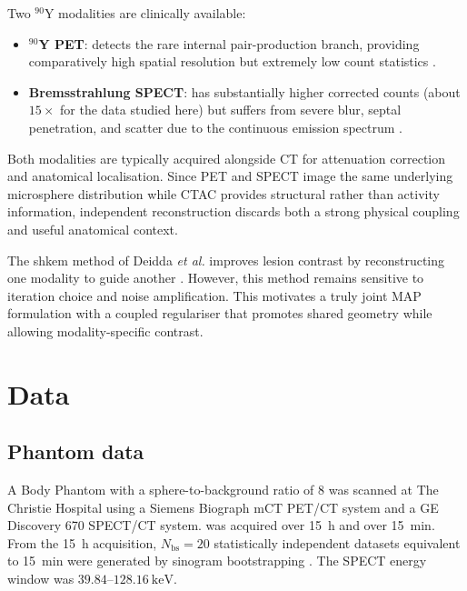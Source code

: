 Two $^{90}$Y modalities are clinically available:
\begin{itemize}
    \item \textbf{$^{90}$Y PET}: detects the rare internal pair-production branch, providing comparatively high spatial resolution but extremely low count statistics \cite{selwynNewInternalPair2007}.
    \item \textbf{Bremsstrahlung SPECT}: has substantially higher corrected counts (about $15\times$ for the data studied here) but suffers from severe blur, septal penetration, and scatter due to the continuous emission spectrum \cite{rongDevelopmentEvaluationImproved2012, minarikEvaluationQuantitative90Y2008}.
\end{itemize}
Both modalities are typically acquired alongside CT for attenuation correction and anatomical localisation. Since PET and SPECT image the same underlying microsphere distribution while CTAC provides structural rather than activity information, independent reconstruction discards both a strong physical coupling and useful anatomical context.

The \gls{shkem} method of Deidda \textit{et al.} improves lesion contrast by reconstructing one modality to guide another \cite{deiddaTripleModalityImage2023, deiddaHybridKernelisedExpectation2022}. However, this method remains sensitive to iteration choice and noise amplification. This motivates a truly joint MAP formulation with a coupled regulariser that promotes shared geometry while allowing modality-specific contrast.

\section{Data}
\label{sec:90y_data}

\subsection{Phantom data}
\label{subsec:90y_phantom}

A   Body Phantom with a sphere-to-background ratio of 8 was scanned at The Christie Hospital using a Siemens Biograph mCT PET/CT system and a GE Discovery 670 SPECT/CT system.  was acquired over \SI{15}{\hour} and  over \SI{15}{\minute}. From the \SI{15}{\hour}  acquisition, $N_{\mathrm{bs}}=20$ statistically independent  datasets equivalent to \SI{15}{\minute} were generated by sinogram bootstrapping \cite{markiewiczAssessmentBootstrapResampling2014}. The SPECT energy window was $39.84$--$128.16~\mathrm{keV}$.

